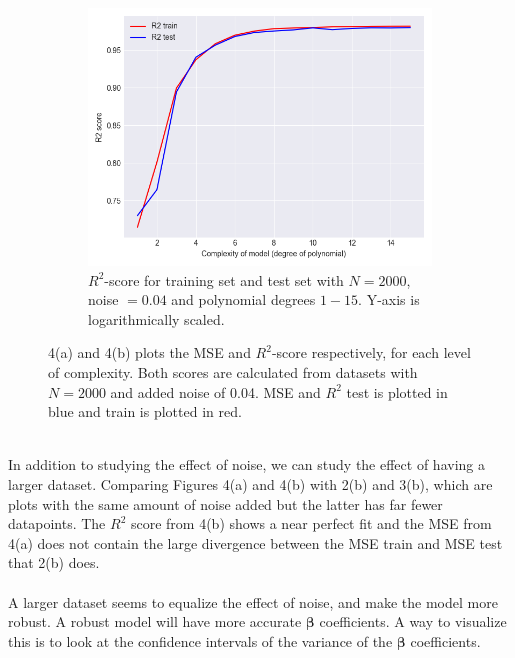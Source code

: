\documentclass[a4paper,twocolumn]{article}
\newcommand{\B}{\boldsymbol{\beta}}
\begin{document}
\begin{figure}[ht]
    \begin{subfigure}[b]{0.9\columnwidth}
        \includegraphics[width=\columnwidth]{r2_vs_complexity_N=2000_Noise=0.04_Degree=1-15.png}
        \caption{$R^{2}$-score for training set and test set with $N = 2000$, noise $= 0.04$ and polynomial degrees $1-15$. Y-axis is logarithmically scaled.}
    \end{subfigure}
    \caption{4(a) and 4(b) plots the MSE and $R^{2}$-score respectively, for each level of complexity. Both scores are calculated from datasets with $N= 2000$ and added noise of 0.04. MSE and $R^{2}$ test is plotted in blue and train is plotted in red.}
\end{figure}\\
In addition to studying the effect of noise, we can study the effect of having a larger dataset. Comparing Figures 4(a) and 4(b) with 2(b) and 3(b), which are plots with the same amount of noise added but the latter has far fewer datapoints. The $R^{2}$ score from 4(b) shows a near perfect fit and the MSE from 4(a) does not contain the large divergence between the MSE train and MSE test that 2(b) does.\\
\\
A larger dataset seems to equalize the effect of noise, and make the model more robust. A robust model will have more accurate $\B$ coefficients. A way to visualize this is to look at the confidence intervals of the variance of the $\B$ coefficients.
\end{document}
